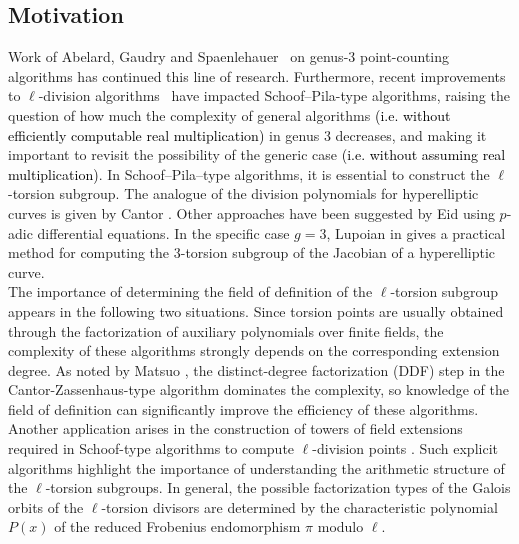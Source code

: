 \documentclass[11pt,a4paper]{article}
\theoremstyle{plain}
\theoremstyle{definition}
\theoremstyle{remark}
\newcommand{\verde}[1]{\textcolor{black}{#1}}
\begin{document}
\subsection{Motivation}
Work of Abelard, Gaudry and Spaenlehauer~\cite{abelard2019counting}  on genus-3 point-counting algorithms has continued this line of research. Furthermore, recent improvements to $\ell$-division algorithms~\cite{Miret24} have impacted Schoof--Pila-type algorithms, raising the question of how much the complexity of general algorithms \verde{(i.e. without efficiently computable real multiplication)} in genus 3 decreases, and making it important to revisit the possibility of the generic case \verde{(i.e. without assuming real multiplication)}.
In  Schoof--Pila--type algorithms, it is essential to construct the $\ell$-torsion subgroup. The analogue of the division polynomials for hyperelliptic curves is given by Cantor \cite{Cantor1994}. Other approaches have been suggested by Eid \cite{EID202368} using $p$-adic differential equations. In the specific case $g=3$, Lupoian in \cite{LUPOIAN26} gives a practical method for computing the 3-torsion subgroup of the Jacobian of a hyperelliptic curve.\\
The importance of determining the field of definition of the \(\ell\)-torsion subgroup appears in the following two situations. Since torsion points are usually obtained through the factorization of auxiliary polynomials over finite fields, the complexity of these algorithms strongly depends on the corresponding extension degree. As noted by Matsuo \cite{IM10}, the distinct-degree factorization (DDF) step in the Cantor-Zassenhaus-type \cite{cantor1981} algorithm dominates the complexity, so knowledge of the field of definition can significantly improve the efficiency of these algorithms. Another application arises in the construction  of towers of field extensions required in Schoof-type algorithms to compute \(\ell\)-division points \cite{GS12, Miret24}.
Such explicit algorithms highlight the importance of understanding the arithmetic structure of the $\ell$-torsion subgroups. In general, the possible factorization types of the Galois orbits of the $\ell$-torsion divisors are determined by the characteristic polynomial $P(x)$ of the reduced Frobenius endomorphism $\pi$ modulo $\ell$.
\end{document}
